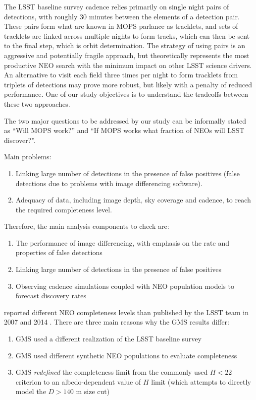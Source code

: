 The LSST baseline survey cadence relies primarily on single night pairs of detections, 
with roughly 30 minutes between the elements of a detection pair. These pairs form 
what are known in MOPS parlance as tracklets, and sets of tracklets are linked across 
multiple nights to form tracks, which can then be sent to the final step, which is orbit 
determination. The strategy of using pairs is an aggressive and potentially fragile
approach, but theoretically represents the most productive NEO search with the minimum 
impact on other LSST science drivers. An alternative to visit each field three times per 
night to form tracklets from triplets of detections may prove more robust, but likely 
with a penalty of reduced performance. One of our study objectives is to understand the
tradeoffs between these two approaches.

The two major questions to be addressed by our study can be informally stated as 
``Will MOPS work?'' and ``If MOPS works what fraction of NEOs will LSST discover?''. 

Main problems:
\begin{enumerate}
\item Linking large number of detections in the presence of false positives (false detections due to problems 
with image differencing software). 
\item Adequacy of data, including image depth, sky coverage and cadence, to reach the required 
completeness level. 
\end{enumerate} 

Therefore, the main analysis components to check are: 
\begin{enumerate}
\item The performance of image differencing, with emphasis on the rate and properties of 
   false detections 
\item Linking large number of detections in the presence of false positives 
\item Observing cadence simulations coupled with NEO population models to forecast 
        discovery rates 
\end{enumerate} 



\cite[hereafter GMS]{GMS2016} reported different NEO completeness levels than
published by the LSST team in 2007 and 2014 . There are three main 
reasons why the GMS results differ:
\begin{enumerate}
\item GMS used a different realization of the LSST baseline survey
\item GMS used different synthetic NEO populations to evaluate completeness
\item GMS {\it redefined} the completeness limit from the commonly
  used $H<22$ criterion to an albedo-dependent value of $H$ limit (which
  attempts to directly model the $D>140$ m size cut)
\end{enumerate}

